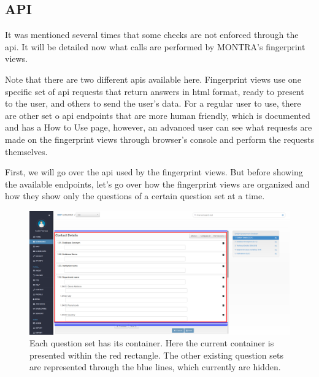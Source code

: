 \subsection*{API}


It was mentioned several times that some checks are not enforced through the \gls{api}.
It will be detailed now what calls are performed by MONTRA's fingerprint views.

Note that there are two different \gls{api}s available here.
Fingerprint views use one specific set of \gls{api} requests that return answers in \gls{html} format, ready to present to the user, and others to send the user's data.
For a regular user to use, there are other set o \gls{api} endpoints that are more human friendly, which is documented and has a How to Use page, however, an advanced user can see what requests are made on the fingerprint views through browser's console and perform the requests themselves.

First, we will go over the \gls{api} used by the fingerprint views.
But before showing the available endpoints, let's go over how the fingerprint views are organized and how they show only the questions of a certain question set at a time.

\begin{figure}[h]
    \center
    \includegraphics[width=\textwidth]{fingerprint-hidden-question-sets}
    \caption{Each question set has its container.
    Here the current container is presented within the red rectangle.
    The other existing question sets are represented through the blue lines, which currently are hidden.}
    \label{fig:fingerprint-hidden-question-sets}
\end{figure}

